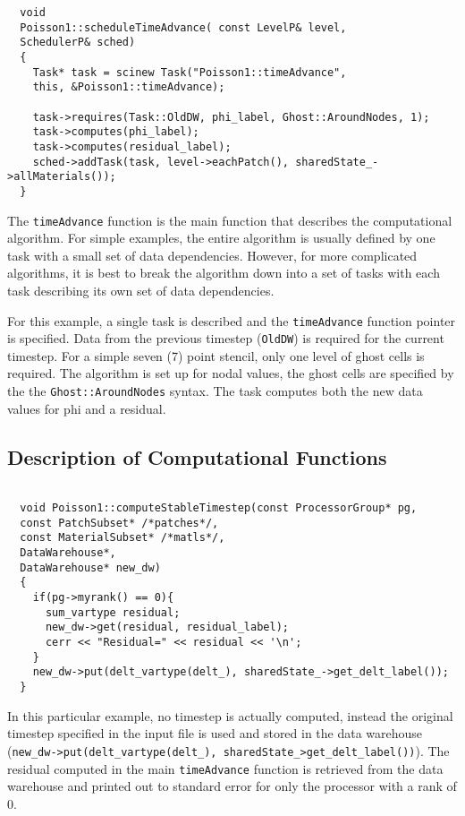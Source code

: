 \documentclass[11pt,fleqn]{book} %
\begin{document}
\begin{lstlisting}
  void
  Poisson1::scheduleTimeAdvance( const LevelP& level,
  SchedulerP& sched)
  {
    Task* task = scinew Task("Poisson1::timeAdvance",
    this, &Poisson1::timeAdvance);

    task->requires(Task::OldDW, phi_label, Ghost::AroundNodes, 1);
    task->computes(phi_label);
    task->computes(residual_label);
    sched->addTask(task, level->eachPatch(), sharedState_->allMaterials());
  }
\end{lstlisting}

The \texttt{timeAdvance} function is the main function that describes
the computational algorithm.  For simple examples, the entire
algorithm is usually defined by one task with a small set of data
dependencies.  However, for more complicated algorithms, it is best to
break the algorithm down into a set of tasks with each task describing
its own set of data dependencies.

For this example, a single task is described and the
\texttt{timeAdvance} function pointer is specified.  Data from the
previous timestep (\texttt{OldDW}) is required for the current
timestep.  For a simple seven (7) point stencil, only one level of
ghost cells is required.  The algorithm is set up for nodal values,
the ghost cells are specified by the the \texttt{Ghost::AroundNodes}
syntax.  The task computes both the new data values for phi and a
residual.

\subsection{Description of Computational Functions}

\begin{lstlisting}

  void Poisson1::computeStableTimestep(const ProcessorGroup* pg,
  const PatchSubset* /*patches*/,
  const MaterialSubset* /*matls*/,
  DataWarehouse*,
  DataWarehouse* new_dw)
  {
    if(pg->myrank() == 0){
      sum_vartype residual;
      new_dw->get(residual, residual_label);
      cerr << "Residual=" << residual << '\n';
    }
    new_dw->put(delt_vartype(delt_), sharedState_->get_delt_label());
  }

\end{lstlisting}

In this particular example, no timestep is actually computed, instead
the original timestep specified in the input file is used and stored
in the data warehouse (\texttt{new\_dw->put(delt\_vartype(delt\_),
  sharedState\_\->get\_delt\_label())}).  The residual computed in the
main \texttt{timeAdvance} function is retrieved from the data
warehouse and printed out to standard error for only the processor
with a rank of 0.
\end{document}
